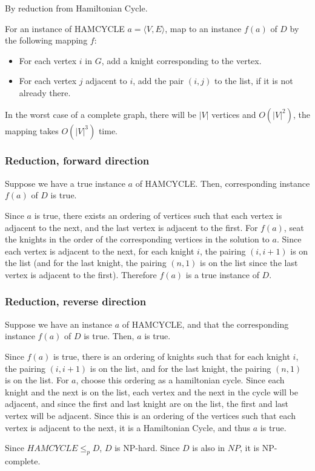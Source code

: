 \documentclass[11pt]{article}
\begin{document}
By reduction from Hamiltonian Cycle.

For an instance of HAMCYCLE $a = \langle V, E \rangle$, map to an instance $f(a)$ of $D$ by the following mapping $f$:
\begin{itemize}
    \item For each vertex $i$ in $G$, add a knight corresponding to the vertex.
    \item For each vertex $j$ adjacent to $i$, add the pair $(i, j)$ to the list, if it is not already there. 
\end{itemize}

In the worst case of a complete graph, there will be $|V|$ vertices and $O(|V|^2)$, the mapping takes $O(|V|^3)$ time. 

\subsubsection*{Reduction, forward direction}
Suppose we have a true instance $a$ of HAMCYCLE. Then, corresponding instance $f(a)$ of $D$ is true.

Since $a$ is true, there exists an ordering of vertices such that each vertex is adjacent to the next, and the last vertex is adjacent to the first. For $f(a)$, seat the knights in the order of the corresponding vertices in the solution to $a$. Since each vertex is adjacent to the next, for each knight $i$, the pairing $(i, i+1)$ is on the list (and for the last knight, the pairing $(n, 1)$ is on the list since the last vertex is adjacent to the first). Therefore $f(a)$ is a true instance of $D$.

\subsubsection*{Reduction, reverse direction}
Suppose we have an instance $a$ of HAMCYCLE, and that the corresponding instance $f(a)$ of $D$ is true. Then, $a$ is true.

Since $f(a)$ is true, there is an ordering of knights such that for each knight $i$, the pairing $(i, i+1)$ is on the list, and for the last knight, the pairing $(n, 1)$ is on the list. For $a$, choose this ordering as a hamiltonian cycle. Since each knight and the next is on the list, each vertex and the next in the cycle will be adjacent, and since the first and last knight are on the list, the first and last vertex will be adjacent. Since this is an ordering of the vertices such that each vertex is adjacent to the next, it is a Hamiltonian Cycle, and thus $a$ is true. 

Since $HAMCYCLE \leq_p D$, $D$ is NP-hard. Since $D$ is also in $NP$, it is NP-complete.
\end{document}
